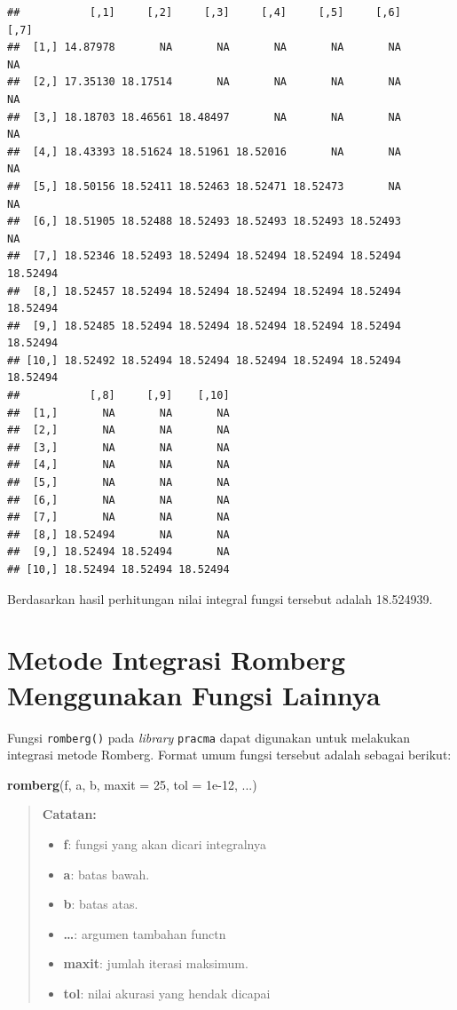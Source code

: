 \documentclass[]{book}
\newenvironment{Shaded}{\begin{snugshade}}{\end{snugshade}}
\newcommand{\DataTypeTok}[1]{\textcolor[rgb]{0.13,0.29,0.53}{#1}}
\newcommand{\DecValTok}[1]{\textcolor[rgb]{0.00,0.00,0.81}{#1}}
\newcommand{\FloatTok}[1]{\textcolor[rgb]{0.00,0.00,0.81}{#1}}
\newcommand{\KeywordTok}[1]{\textcolor[rgb]{0.13,0.29,0.53}{\textbf{#1}}}
\newcommand{\NormalTok}[1]{#1}
\providecommand{\tightlist}{%
  \setlength{\itemsep}{0pt}\setlength{\parskip}{0pt}}
\theoremstyle{definition}
\theoremstyle{definition}
\theoremstyle{definition}
\theoremstyle{remark}
\begin{document}
\begin{verbatim}
##           [,1]     [,2]     [,3]     [,4]     [,5]     [,6]     [,7]
##  [1,] 14.87978       NA       NA       NA       NA       NA       NA
##  [2,] 17.35130 18.17514       NA       NA       NA       NA       NA
##  [3,] 18.18703 18.46561 18.48497       NA       NA       NA       NA
##  [4,] 18.43393 18.51624 18.51961 18.52016       NA       NA       NA
##  [5,] 18.50156 18.52411 18.52463 18.52471 18.52473       NA       NA
##  [6,] 18.51905 18.52488 18.52493 18.52493 18.52493 18.52493       NA
##  [7,] 18.52346 18.52493 18.52494 18.52494 18.52494 18.52494 18.52494
##  [8,] 18.52457 18.52494 18.52494 18.52494 18.52494 18.52494 18.52494
##  [9,] 18.52485 18.52494 18.52494 18.52494 18.52494 18.52494 18.52494
## [10,] 18.52492 18.52494 18.52494 18.52494 18.52494 18.52494 18.52494
##           [,8]     [,9]    [,10]
##  [1,]       NA       NA       NA
##  [2,]       NA       NA       NA
##  [3,]       NA       NA       NA
##  [4,]       NA       NA       NA
##  [5,]       NA       NA       NA
##  [6,]       NA       NA       NA
##  [7,]       NA       NA       NA
##  [8,] 18.52494       NA       NA
##  [9,] 18.52494 18.52494       NA
## [10,] 18.52494 18.52494 18.52494
\end{verbatim}

Berdasarkan hasil perhitungan nilai integral fungsi tersebut adalah 18.524939.

\hypertarget{metode-integrasi-romberg-menggunakan-fungsi-lainnya}{%
\section{Metode Integrasi Romberg Menggunakan Fungsi Lainnya}\label{metode-integrasi-romberg-menggunakan-fungsi-lainnya}}

Fungsi \texttt{romberg()} pada \emph{library} \texttt{pracma} dapat digunakan untuk melakukan integrasi metode Romberg. Format umum fungsi tersebut adalah sebagai berikut:

\begin{Shaded}
\begin{Highlighting}[]
\KeywordTok{romberg}\NormalTok{(f, a, b, }\DataTypeTok{maxit =} \DecValTok{25}\NormalTok{, }\DataTypeTok{tol =} \FloatTok{1e-12}\NormalTok{, ...)}
\end{Highlighting}
\end{Shaded}

\begin{quote}
\textbf{Catatan:}

\begin{itemize}
\tightlist
\item
  \textbf{f}: fungsi yang akan dicari integralnya
\item
  \textbf{a}: batas bawah.
\item
  \textbf{b}: batas atas.
\item
  \textbf{\ldots{}}: argumen tambahan functn
\item
  \textbf{maxit}: jumlah iterasi maksimum.
\item
  \textbf{tol}: nilai akurasi yang hendak dicapai
\end{itemize}
\end{quote}
\end{document}

